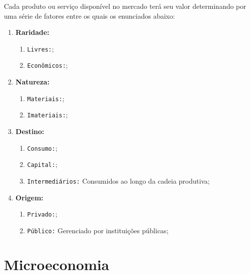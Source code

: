 \documentclass{article}
\begin{document}
            Cada produto ou serviço disponível no mercado terá seu valor determinando por uma série de fatores entre os quais os enunciados abaixo:
                \begin{enumerate}
                    \item \textbf{Raridade:}
                        \begin{enumerate}[noitemsep]
                            \item \texttt{Livres:};
                            \item \texttt{Econômicos:};
                        \end{enumerate}

                    \item \textbf{Natureza:}
                        \begin{enumerate}[noitemsep]
                            \item \texttt{Materiais:};
                            \item \texttt{Imateriais:};
                        \end{enumerate}

                    \item \textbf{Destino:}
                        \begin{enumerate}[noitemsep]
                            \item \texttt{Consumo:};
                            \item \texttt{Capital:};
                            \item \texttt{Intermediários:} Consumidos ao longo da cadeia produtiva;
                        \end{enumerate}

                    \item \textbf{Origem:}
                        \begin{enumerate}[noitemsep]
                            \item \texttt{Privado:};
                            \item \texttt{Público:} Gerenciado por instituições públicas;
                        \end{enumerate}
                \end{enumerate}

    \section{Microeconomia}
\end{document}
